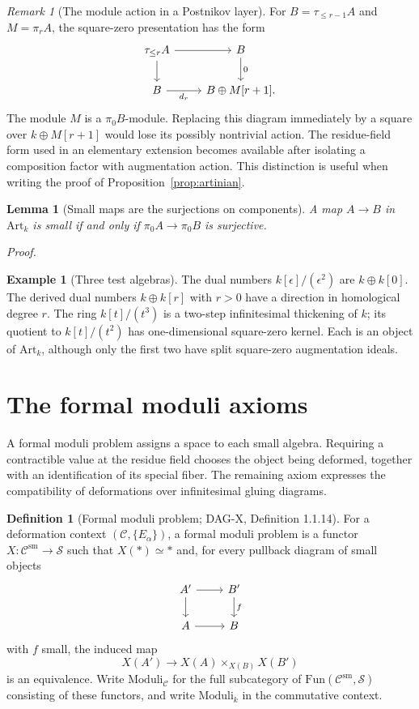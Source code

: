 \documentclass[12pt,letterpaper,oneside]{report}
\newtheorem{lemma}[theorem]{Lemma}
\theoremstyle{definition}
\newtheorem{definition}[theorem]{Definition}
\newtheorem{example}[theorem]{Example}
\theoremstyle{remark}
\newtheorem{remark}[theorem]{Remark}
\renewenvironment{proof}[1][Proof]{\par\nopagebreak[4]\addvspace{4pt}\noindent\textit{#1.}\par\nobreak\vspace{0.5\baselineskip}}{\par\addvspace{4pt}}
\newcommand{\cS}{\mathcal S}
\newcommand{\cC}{\mathcal C}
\newcommand{\FMP}{\mathrm{Moduli}}
\newcommand{\Art}{\mathrm{Art}_k}
\newcommand{\Fun}{\mathrm{Fun}}
\newcommand{\sm}{\mathrm{sm}}
\newcommand{\term}{*}
\begin{document}
\begin{remark}[The module action in a Postnikov layer]
For $B=\tau_{\leq r-1}A$ and $M=\pi_rA$, the square-zero presentation has the form
\[
\begin{tikzcd}
 \tau_{\leq r}A\ar[r]\ar[d] & B\ar[d,"0"] \\
 B\ar[r,"d_r"'] & B\oplus M[r+1].
\end{tikzcd}
\]
The module $M$ is a $\pi_0B$-module. Replacing this diagram immediately by a square over $k\oplus M[r+1]$ would lose its possibly nontrivial action. The residue-field form used in an elementary extension becomes available after isolating a composition factor with augmentation action. This distinction is useful when writing the proof of Proposition~\ref{prop:artinian}.
\end{remark}

\begin{lemma}[Small maps are the surjections on components]
\label{lem:small-surjection}
A map $A\to B$ in $\Art$ is small if and only if $\pi_0A\to\pi_0B$ is surjective.
\end{lemma}
\begin{proof}
\end{proof}

\begin{example}[Three test algebras]
The dual numbers $k[\epsilon]/(\epsilon^2)$ are $k\oplus k[0]$. The derived dual numbers $k\oplus k[r]$ with $r>0$ have a direction in homological degree $r$. The ring $k[t]/(t^3)$ is a two-step infinitesimal thickening of $k$; its quotient to $k[t]/(t^2)$ has one-dimensional square-zero kernel. Each is an object of $\Art$, although only the first two have split square-zero augmentation ideals.
\end{example}

\section{The formal moduli axioms}
\label{sec:fmp}

A formal moduli problem assigns a space to each small algebra. Requiring a contractible value at the residue field chooses the object being deformed, together with an identification of its special fiber. The remaining axiom expresses the compatibility of deformations over infinitesimal gluing diagrams.

\begin{definition}[Formal moduli problem; DAG-X, Definition 1.1.14]
For a deformation context $(\cC,\{E_\alpha\})$, a formal moduli problem is a functor $X:\cC^{\sm}\to\cS$ such that $X(\term)\simeq\term$ and, for every pullback diagram of small objects
\[
\begin{tikzcd}
 A'\ar[r]\ar[d] & B'\ar[d,"f"] \\
 A\ar[r] & B
\end{tikzcd}
\]
with $f$ small, the induced map
\[
 X(A')\longrightarrow X(A)\mathbin{\times}_{X(B)}X(B')
\]
is an equivalence. Write $\FMP_{\cC}$ for the full subcategory of $\Fun(\cC^{\sm},\cS)$ consisting of these functors, and write $\FMP_k$ in the commutative context.
\end{definition}
\end{document}
